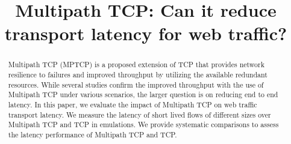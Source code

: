 \documentclass[conference,a4paper]{IEEEtran}
\theoremstyle{definition}
\newcommand{\per}[1]{\textcolor{orange}{{\sf PH: #1}}}
\begin{document}
\title{Multipath TCP: Can it reduce transport latency for web traffic?}

\author{
}

\maketitle


\begin{abstract}
Multipath TCP (MPTCP) is a proposed extension of TCP that provides network resilience to failures
and improved throughput by utilizing the available redundant resources. While several studies confirm
the improved throughput with the use of Multipath TCP under various scenarios, the larger question is on reducing end to end latency.  In this paper, we evaluate the impact of Multipath TCP 
on web traffic transport latency. We measure the latency of short lived flows 
of different sizes over Multipath TCP and TCP in emulations. We provide systematic comparisons 
to assess the latency performance of Multipath TCP and TCP.

\end{abstract}














\end{document}
